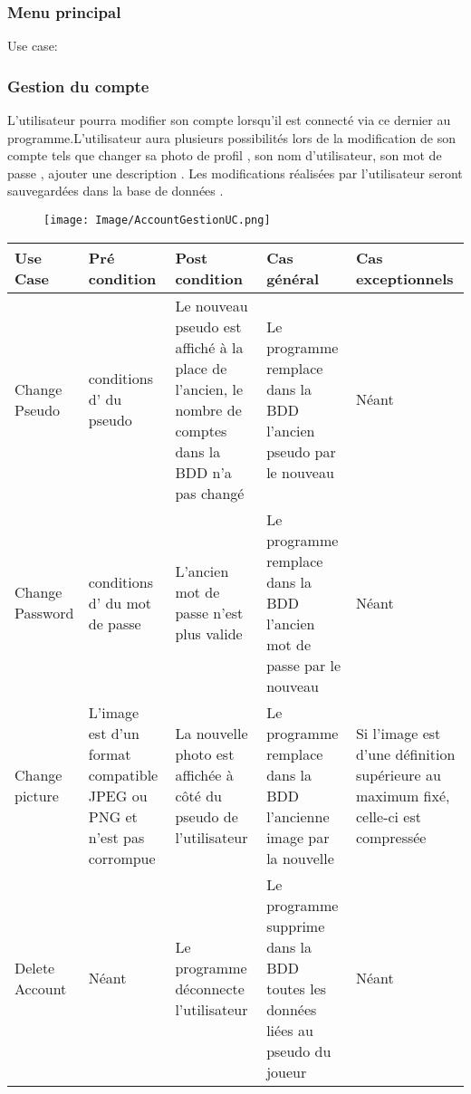 \documentclass[french, utf8]{article}
\begin{document}
\subsubsection{Menu principal}
\label{sec:MenuPrincipalSystem}

Use case: 

\subsubsection{Gestion du compte}
\label{sec:GestionDeCompte}
L'utilisateur pourra modifier son compte lorsqu'il est connecté via ce dernier au programme.L'utilisateur aura plusieurs possibilités lors de la modification de son compte tels que changer sa photo de profil , son nom d'utilisateur, son mot de passe , ajouter une description . Les modifications réalisées par l'utilisateur seront sauvegardées dans la base de données .
\begin{figure}[ht]
     \centering
    \texttt{[image: Image/AccountGestionUC.png]}
\end{figure}

\begin{center}
\begin{tabular}{|m{3cm}|m{3cm}|m{3cm}|m{3cm}|m{3cm}|}
\hline  Use Case & Pré condition      &  Post condition  & Cas général & Cas exceptionnels\\

\hline Change Pseudo  & conditions d'\nameref{sec:Enregistrement} du pseudo & Le nouveau pseudo est affiché à la place de l'ancien, le nombre de comptes dans la BDD n'a pas changé & Le programme remplace dans la BDD l'ancien pseudo par le nouveau & Néant \\
\hline Change Password  & conditions d'\nameref{sec:Enregistrement} du mot de passe & L'ancien mot de passe n'est plus valide & Le programme remplace dans la BDD l'ancien mot de passe par le nouveau & Néant \\
\hline Change picture  & L'image est d'un format compatible JPEG ou PNG et n'est pas corrompue & La nouvelle photo est affichée à côté du pseudo de l'utilisateur & Le programme remplace dans la BDD l'ancienne image par la nouvelle & Si l'image est d'une définition supérieure au maximum fixé, celle-ci est compressée \\
\hline Delete Account  & Néant &  Le programme déconnecte l'utilisateur  & Le programme supprime dans la BDD toutes les données liées au pseudo du joueur & Néant \\
\hline
\end{tabular}\\
\end{center}
\end{document}
